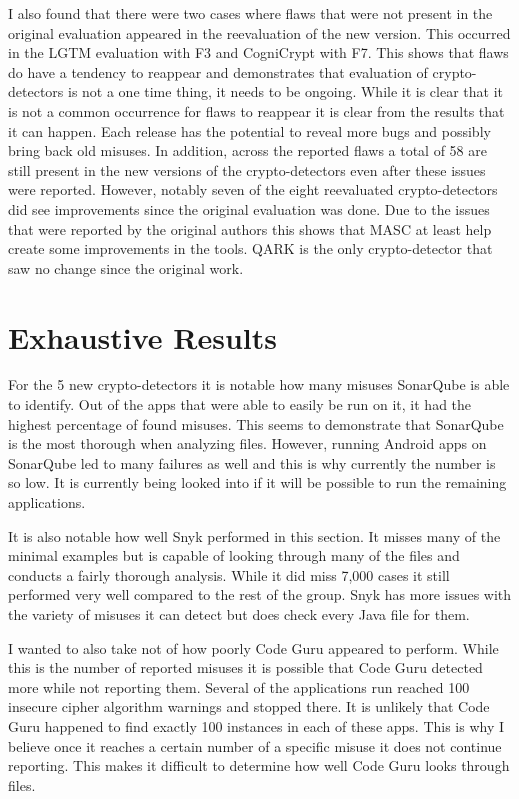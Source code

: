 I also found that there were two cases where flaws that were not present in the original evaluation appeared in the reevaluation of the new version. This occurred in the LGTM evaluation with F3 and CogniCrypt with F7.  This shows that flaws do have a tendency to reappear and demonstrates that evaluation of crypto-detectors is not a one time thing, it needs to be ongoing. While it is clear that it is not a common occurrence for flaws to reappear it is clear from the results that it can happen. Each release has the potential to reveal more bugs and possibly bring back old misuses. In addition, across the reported flaws a total of 58 are still present in the new versions of the crypto-detectors even after these issues were reported. However, notably seven of the eight reevaluated crypto-detectors did see improvements since the original evaluation was done. Due to the issues that were reported by the original authors this shows that MASC at least help create some improvements in the tools. QARK is the only crypto-detector that saw no change since the original work.

\section{Exhaustive Results}
\label{ch5:sec:exhaustive}



For the 5 new crypto-detectors it is notable how many misuses SonarQube is able to identify. Out of the apps that were able to easily be run on it, it had the highest percentage of found misuses. This seems to demonstrate that SonarQube is the most thorough when analyzing files. However, running Android apps on SonarQube led to many failures as well and this is why currently the number is so low. It is currently being looked into if it will be possible to run the remaining applications. 

It is also notable how well Snyk performed in this section. It misses many of the minimal examples but is capable of looking through many of the files and conducts a fairly thorough analysis. While it did miss 7,000 cases it still performed very well compared to the rest of the group. Snyk has more issues with the variety of misuses it can detect but does check every Java file for them.

I wanted to also take not of how poorly Code Guru appeared to perform. While this is the number of reported misuses it is possible that Code Guru detected more while not reporting them. Several of the applications run reached 100 insecure cipher algorithm warnings and stopped there. It is unlikely that Code Guru happened to find exactly 100 instances in each of these apps. This is why I believe once it reaches a certain number of a specific misuse it does not continue reporting. This makes it difficult to determine how well Code Guru looks through files.

